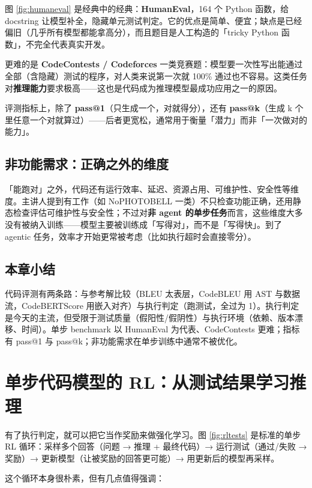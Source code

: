 ﻿\documentclass[a4paper]{article}
\begin{document}
图 \ref{fig:humaneval} 是经典中的经典：\textbf{HumanEval}，164 个 Python 函数，给 docstring 让模型补全，隐藏单元测试判定。它的优点是简单、便宜；缺点是已经偏旧（几乎所有模型都能拿高分），而且题目是人工构造的「tricky Python 函数」，不完全代表真实开发。

更难的是 \textbf{CodeContests / Codeforces} 一类竞赛题：模型要一次性写出能通过全部（含隐藏）测试的程序，对人类来说第一次就 100\% 通过也不容易。这类任务对\textbf{推理能力}要求极高——这也是代码成为推理模型最成功应用之一的原因。

评测指标上，除了 \textbf{pass@1}（只生成一个，对就得分），还有 \textbf{pass@k}（生成 k 个里任意一个对就算过）——后者更宽松，通常用于衡量「潜力」而非「一次做对的能力」。

\subsection{非功能需求：正确之外的维度}

「能跑对」之外，代码还有运行效率、延迟、资源占用、可维护性、安全性等维度。主讲人提到有工作（如 NoPHOTOBELL 一类）不只检查功能正确，还用静态检查评估可维护性与安全性；不过对\textbf{非 agent 的单步任务}而言，这些维度大多没有被纳入训练——模型主要被训练成「写得对」，而不是「写得快」。到了 agentic 任务，效率才开始更常被考虑（比如执行超时会直接零分）。

\subsection{本章小结}
代码评测有两条路：与参考解比较（BLEU 太表层，CodeBLEU 用 AST 与数据流，CodeBERTScore 用嵌入对齐）与执行判定（跑测试，全过为 1）。执行判定是今天的主流，但受限于测试质量（假阳性/假阴性）与执行环境（依赖、版本漂移、时间）。单步 benchmark 以 HumanEval 为代表、CodeContests 更难；指标有 pass@1 与 pass@k；非功能需求在单步训练中通常不被优化。

\section{单步代码模型的 RL：从测试结果学习推理}

有了执行判定，就可以把它当作奖励来做强化学习。图 \ref{fig:rltests} 是标准的单步 RL 循环：采样多个回答（问题 → 推理 + 最终代码）→ 运行测试（通过/失败 → 奖励）→ 更新模型（让被奖励的回答更可能）→ 用更新后的模型再采样。

这个循环本身很朴素，但有几点值得强调：
\end{document}
